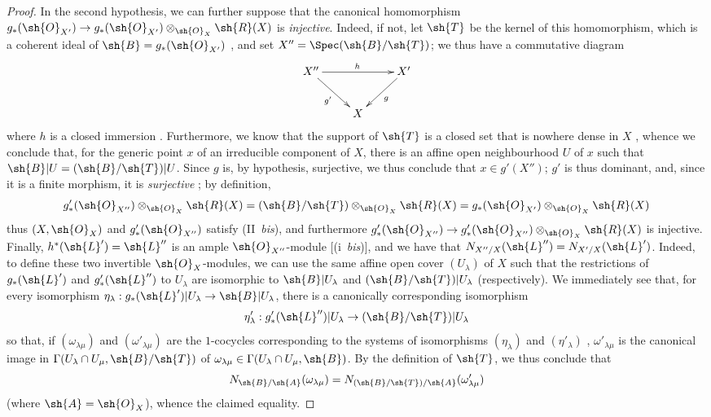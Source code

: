 \begin{proof}
In the second hypothesis, we can further suppose that the canonical homomorphism $g_*(\sh{O}_{X'})\to g_*(\sh{O}_{X'})\otimes_{\sh{O}_X}\sh{R}(X)$ is \emph{injective}.
Indeed, if not, let $\sh{T}$ be the kernel of this homomorphism, which is a coherent ideal of $\sh{B}=g_*(\sh{O}_{X'})$ , and set $X''=\Spec(\sh{B}/\sh{T})$;
we thus have a commutative diagram
\[
  \xymatrix{
    X'' \ar[rr]^{h} \ar[dr]_{g'}
    && X' \ar[dl]^{g}
  \\&X
  }
\]
where $h$ is a closed immersion .
Furthermore, we know that the support of $\sh{T}$ is a closed set  that is nowhere dense in $X$ , whence we conclude that, for the generic point $x$ of an irreducible component of $X$, there is an affine open neighbourhood $U$ of $x$ such that $\sh{B}|U=(\sh{B}/\sh{T})|U$.
Since $g$ is, by hypothesis, surjective, we thus conclude that $x\in g'(X'')$;
$g'$ is thus dominant, and, since it is a finite morphism, it is \emph{surjective} ;
by definition,
\[
  g'_*(\sh{O}_{X''})\otimes_{\sh{O}_X}\sh{R}(X)
  = (\sh{B}/\sh{T})\otimes_{\sh{O}_X}\sh{R}(X)
  = g_*(\sh{O}_{X'})\otimes_{\sh{O}_X}\sh{R}(X)
\]
thus $(X,\sh{O}_X)$ and $g'_*(\sh{O}_{X''})$ satisfy (II~\emph{bis}), and furthermore $g'_*(\sh{O}_{X''})\to g'_*(\sh{O}_{X''})\otimes_{\sh{O}_X}\sh{R}(X)$ is injective.
Finally, $h^*(\sh{L}')=\sh{L}''$ is an ample $\sh{O}_{X''}$-module [(i~\emph{bis})], and we have that $N_{X''/X}(\sh{L}'')=N_{X'/X}(\sh{L}')$.
Indeed, to define these two invertible $\sh{O}_X$-modules, we can use the same affine open cover $(U_\lambda)$ of $X$ such that the restrictions of $g_*(\sh{L}')$ and $g'_*(\sh{L}'')$ to $U_\lambda$ are isomorphic to $\sh{B}|U_\lambda$ and $(\sh{B}/\sh{T})|U_\lambda$ (respectively).
We immediately see that, for every isomorphism $\eta_\lambda:g_*(\sh{L}')|U_\lambda\to\sh{B}|U_\lambda$, there is a canonically corresponding isomorphism
\[
  \eta'_\lambda : g'_*(\sh{L}'')|U_\lambda \to (\sh{B}/\sh{T})|U_\lambda
\]
so that, if $(\omega_{\lambda\mu})$ and $(\omega'_{\lambda\mu})$ are the $1$-cocycles corresponding to the systems of isomorphisms $(\eta_\lambda)$ and $(\eta'_\lambda)$ , $\omega'_{\lambda\mu}$ is the canonical image in $\Gamma(U_\lambda\cap U_\mu,\sh{B}/\sh{T})$ of $\omega_{\lambda\mu}\in\Gamma(U_\lambda\cap U_\mu,\sh{B})$.
By the definition of $\sh{T}$, we thus conclude that
\[
  N_{\sh{B}/\sh{A}}(\omega_{\lambda\mu}) = N_{(\sh{B}/\sh{T})/\sh{A}}(\omega'_{\lambda\mu})
\]
(where $\sh{A}=\sh{O}_X$), whence the claimed equality.


\end{proof}
